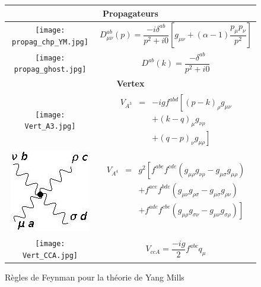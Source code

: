 \documentclass[a4paper,11pt]{article}
\theoremstyle{plain}
\theoremstyle{definition}
\theoremstyle{remark}
\numberwithin{equation}{section}
\numberwithin{equation}{subsection}
\numberwithin{figure}{section}
\begin{document}
\begin{figure}[H]
\begin{center}
\begin{tabular}{|c|p{7cm}|}
   \hline
   \multicolumn{2}{c|}{\textbf{\large Propagateurs}} \\
   \hline
   \texttt{[image: propag\_chp\_YM.jpg]} & 
\begin{equation*}
 D^{ab}_{\mu \nu} (p) = \frac{-i \delta^{ab}}{p^2 + i0} \left[ g_{\mu \nu} + (\alpha - 1)\frac{p_{\mu} p_{\nu}}{p^2}  \right]
\end{equation*}\\
   \hline
   \texttt{[image: propag\_ghost.jpg]} & 
\begin{equation*}
 D^{ab} (k) = \frac{-\delta^{ab}}{p^2+i0} 
\end{equation*}\\
   \hline
   \multicolumn{2}{c|}{\textbf{\large Vertex}} \\
   \hline
   \texttt{[image: Vert\_A3.jpg]} & 
\begin{eqnarray*}
 V_{A^{3}} &=& -i g f^{abd}  \left[  (p-k)_{\rho}g_{\mu \nu} \right. \\
                     && +(k-q)_{\mu}g_{\nu \rho} \\
                     && + \left. (q-p)_{\nu} g_{\mu \rho} \right]
\end{eqnarray*}\\
   \hline
   \includegraphics[scale = 0.6]{Vert_A4.jpg} & 
\begin{eqnarray*}
 V_{A^{4}} &=& g^{2} \left[ f^{abe} f^{cde} \left( g_{\mu \rho}g_{\nu \rho} - g_{\mu \sigma}g_{\mu \rho} \right) \right.\\
&& + f^{ace} f^{bde} \left( g_{\mu \nu}g_{\rho \sigma} - g_{\mu \sigma}g_{\rho \nu} \right) \\
&& \left. +f^{ade} f^{cbe} \left( g_{\mu \rho}g_{\sigma \nu} - g_{\mu \nu}g_{\sigma \rho} \right) \right]  \\
\end{eqnarray*}\\
   \hline
   \texttt{[image: Vert\_CCA.jpg]} & 
\begin{equation*}
 V_{ccA} = \frac{-ig}{2}f^{abc}q_{\mu}
\end{equation*}\\
   \hline
\end{tabular}
\end{center}
\caption{Règles de Feynman pour la théorie de Yang Mills}
\end{figure}
\end{document}
